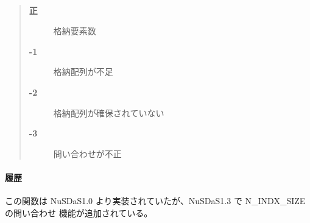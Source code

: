 \paragraph{\ResultCode}
\begin{quote}
\begin{description}
\item[{\bf 正}] 格納要素数
\item[{\bf -1}] 格納配列が不足
\item[{\bf -2}] 格納配列が確保されていない
\item[{\bf -3}] 問い合わせが不正
\end{description}\end{quote}
\paragraph{ 履歴 }
この関数は NuSDaS1.0 より実装されていたが、NuSDaS1.3 で N\_INDX\_SIZE の問い合わせ
機能が追加されている。
